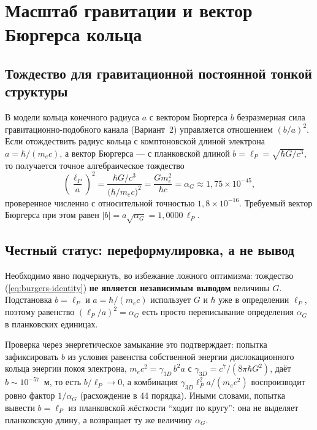 

\section{Масштаб гравитации и вектор Бюргерса кольца}
\label{sec:burgers-scale}

\subsection{Тождество для гравитационной постоянной тонкой структуры}

В модели кольца конечного радиуса $a$ с вектором Бюргерса $b$
безразмерная сила гравитационно-подобного канала (Вариант~2)
управляется отношением $(b/a)^2$. Если отождествить радиус кольца с
комптоновской длиной электрона $a=\hbar/(m_ec)$, а вектор Бюргерса --- с
планковской длиной $b=\ell_{P}=\sqrt{\hbar G/c^3}$, то получается точное
алгебраическое тождество
\begin{equation}
\left(\frac{\ell_P}{a}\right)^2
= \frac{\hbar G/c^3}{\big(\hbar/m_ec\big)^2}
= \frac{G m_e^2}{\hbar c}
= \alpha_G \approx 1{,}75\times10^{-45},
\label{eq:burgers-identity}
\end{equation}
проверенное численно с относительной точностью $1{,}8\times10^{-16}$.
Требуемый вектор Бюргерса при этом равен $|b|=a\sqrt{\alpha_G}
=1{,}0000\,\ell_P$.

\subsection{Честный статус: переформулировка, а не вывод}

Необходимо явно подчеркнуть, во избежание ложного оптимизма: тождество
(\ref{eq:burgers-identity}) \textbf{не является независимым выводом}
величины $G$. Подстановка $b=\ell_P$ и $a=\hbar/(m_ec)$ использует $G$ и
$\hbar$ уже в определении $\ell_P$, поэтому равенство
$(\ell_P/a)^2=\alpha_G$ есть просто переписывание определения $\alpha_G$
в планковских единицах.

Проверка через энергетическое замыкание это подтверждает: попытка
зафиксировать $b$ из условия равенства собственной энергии
дислокационного кольца энергии покоя электрона,
$m_ec^2 = \gamma_{3D}\,b^2 a$ с $\gamma_{3D}=c^7/(8\pi\hbar G^2)$, даёт
$b\sim10^{-57}$~м, то есть $b/\ell_P\to0$, а комбинация
$\gamma_{3D}\ell_P^2 a / (m_ec^2)$ воспроизводит ровно фактор
$1/\alpha_G$ (расхождение в 44 порядка). Иными словами, попытка вывести
$b=\ell_P$ из планковской жёсткости \enquote{ходит по кругу}: она не
выделяет планковскую длину, а возвращает ту же величину $\alpha_G$.

